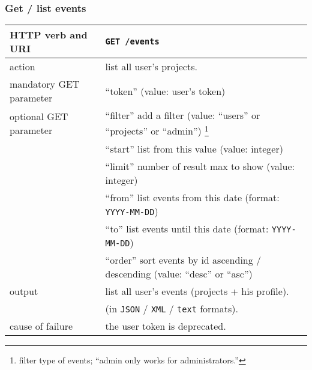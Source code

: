 \subsubsection{Get / list events}
\begin{tabular}{ | l | l | }
	\hline
	HTTP verb and URI & \texttt{GET /events} \\
	\hline
	action & list all user's projects. \\
	\hline
	mandatory GET parameter & ``token'' (value: user's token) \\
	\hline
	optional GET parameter & ``filter'' add a filter (value: ``users'' or ``projects'' or ``admin'') \footnote{filter type of events; ``admin only works for administrators.''} \\
	\space & ``start'' list from this value (value: integer) \\
	\space & ``limit'' number of result max to show (value: integer) \\
	\space & ``from'' list events from this date (format: \texttt{YYYY-MM-DD}) \\
	\space & ``to'' list events until this date (format: \texttt{YYYY-MM-DD}) \\
	\space & ``order'' sort events by id ascending / descending (value: ``desc'' or ``asc'')  \\
	\hline
	output & list all user's events (projects + his profile).  \\
	\space & (in \texttt{JSON} / \texttt{XML} / \texttt{text} formats). \\
	\hline
	cause of failure & the user token is deprecated. \\
	\hline
\end{tabular}
\newline

